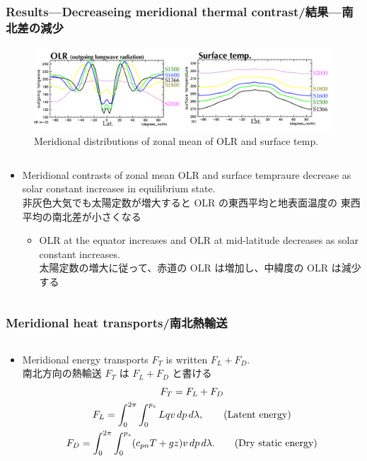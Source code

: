 \documentclass[aspectratio=149,9pt,fleqn,tbtags]{beamer}
\newcommand{\jp}[1]{{\footnotesize #1}}
\begin{document}
\begin{frame}
	\frametitle{Results---Decreaseing meridional thermal contrast/結果---南北差の減少}
	\begin{figure}
		\centering\footnotesize
		\includegraphics[width=.8\textwidth]{fig-osr-surftemp.pdf}\\
		Meridional distributions of zonal mean of OLR and surface temp.
	\end{figure}
	\begin{columns}[T]
		\begin{column}{\textwidth}
			\begin{itemize}
				\item Meridional contrasts of zonal mean OLR and surface tempraure
					decrease as solar constant increases in equilibrium state.\\
					\jp{非灰色大気でも太陽定数が増大すると OLR の東西平均と地表面温度の
					東西平均の南北差が小さくなる}
					\begin{itemize}
						\item OLR at the equator increases and OLR at mid-latitude
							decreases as solar constant increases.\\
							\jp{太陽定数の増大に従って、赤道の OLR は増加し、中緯度の OLR は減少する}
					\end{itemize}
			\end{itemize}
		\end{column}
	\end{columns}
\end{frame}

\begin{frame}
	\frametitle{Meridional heat transports/南北熱輸送}
	\begin{columns}[T]
		\begin{column}{\textwidth}
			\begin{itemize}
				\item Meridional energy transports \(F_T\) is written \(F_L+F_D\).\\
					\jp{南北方向の熱輸送 \(F_T\) は \(F_L+F_D\) と書ける}
					\begin{gather}
						F_T=F_L+F_D\notag\\
						F_L=\int_0^{2\pi}\int_0^{p_s} Lqv\,dp\,d\lambda,\tag{Latent energy}\\
						F_D=\int_0^{2\pi}\int_0^{p_s} (c_{pn}T+gz)v\,dp\,d\lambda.\tag{Dry static energy}
					\end{gather}
			\end{itemize}
		\end{column}
	\end{columns}
\end{frame}
\end{document}
